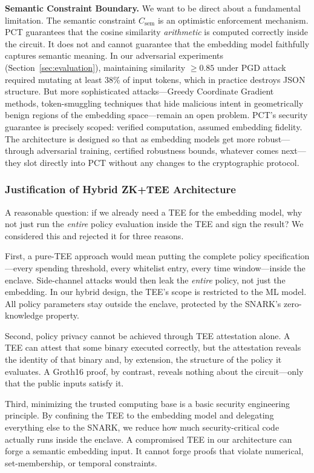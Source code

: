\documentclass[10pt,conference]{IEEEtran}
\begin{document}
\textbf{Semantic Constraint Boundary.} We want to be direct about a fundamental limitation. The semantic constraint $C_{\text{sem}}$ is an optimistic enforcement mechanism. PCT guarantees that the cosine similarity \emph{arithmetic} is computed correctly inside the circuit. It does not and cannot guarantee that the embedding model faithfully captures semantic meaning. In our adversarial experiments (Section~\ref{sec:evaluation}), maintaining similarity $\geq 0.85$ under PGD attack required mutating at least 38\% of input tokens, which in practice destroys JSON structure. But more sophisticated attacks---Greedy Coordinate Gradient methods, token-smuggling techniques that hide malicious intent in geometrically benign regions of the embedding space---remain an open problem. PCT's security guarantee is precisely scoped: verified computation, assumed embedding fidelity. The architecture is designed so that as embedding models get more robust---through adversarial training, certified robustness bounds, whatever comes next---they slot directly into PCT without any changes to the cryptographic protocol.

\subsubsection{Justification of Hybrid ZK+TEE Architecture}
\label{sec:tee_justification}

A reasonable question: if we already need a TEE for the embedding model, why not just run the \emph{entire} policy evaluation inside the TEE and sign the result? We considered this and rejected it for three reasons.

First, a pure-TEE approach would mean putting the complete policy specification---every spending threshold, every whitelist entry, every time window---inside the enclave. Side-channel attacks would then leak the \emph{entire} policy, not just the embedding. In our hybrid design, the TEE's scope is restricted to the ML model. All policy parameters stay outside the enclave, protected by the SNARK's zero-knowledge property.

Second, policy privacy cannot be achieved through TEE attestation alone. A TEE can attest that some binary executed correctly, but the attestation reveals the identity of that binary and, by extension, the structure of the policy it evaluates. A Groth16 proof, by contrast, reveals nothing about the circuit---only that the public inputs satisfy it.

Third, minimizing the trusted computing base is a basic security engineering principle. By confining the TEE to the embedding model and delegating everything else to the SNARK, we reduce how much security-critical code actually runs inside the enclave. A compromised TEE in our architecture can forge a semantic embedding input. It cannot forge proofs that violate numerical, set-membership, or temporal constraints.
\end{document}
